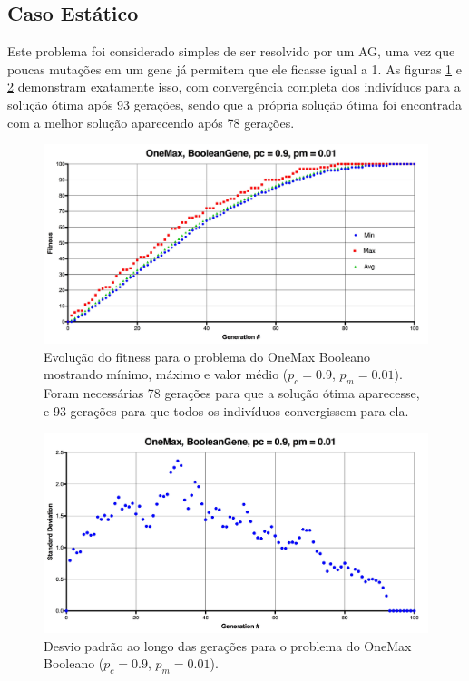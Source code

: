 \subsection{Caso Estático}

Este problema foi considerado simples de ser resolvido por um AG, uma vez que poucas mutações em um gene já permitem que ele ficasse igual a 1. As figuras \ref{fig:onemax_boolean} e \ref{fig:onemax_boolean_std} demonstram exatamente isso, com convergência completa dos indivíduos para a solução ótima após 93 gerações, sendo que a própria solução ótima foi encontrada com a melhor solução aparecendo após 78 gerações.

\begin{figure}[ht!]
    \centering \includegraphics[width=1.0\textwidth]{onemax_boolean.jpg}
    \caption{Evolução do fitness para o problema do OneMax Booleano mostrando mínimo, máximo e valor médio ($p_c=0.9$, $p_m=0.01$). Foram necessárias 78 gerações para que a solução ótima aparecesse, e 93 gerações para que todos os indivíduos convergissem para ela.}
    \label{fig:onemax_boolean}
\end{figure}

\begin{figure}[ht!]
    \centering \includegraphics[width=1.0\textwidth]{onemax_boolean_std.jpg}
    \caption{Desvio padrão ao longo das gerações para o problema do OneMax Booleano ($p_c=0.9$, $p_m=0.01$).}
    \label{fig:onemax_boolean_std}
\end{figure}

